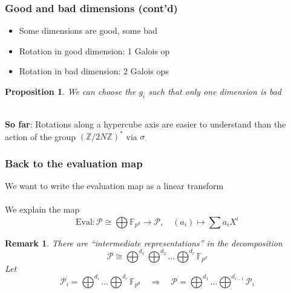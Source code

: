 \documentclass{beamer}
\newcommand{\Z}{\mathbb{Z}}
\newcommand{\F}{\mathbb{F}}
\newtheorem{remark}{Remark}
\newtheorem{prop}{Proposition}
\begin{document}
\begin{frame}
    \frametitle{Good and bad dimensions (cont'd)}

    \begin{itemize}
        \item Some dimensions are good, some bad
        \item Rotation in good dimension: 1 Galois op
        \item Rotation in bad dimension: 2 Galois ops
    \end{itemize}
    \begin{prop}
        We can choose the $g_i$ such that only one dimension is bad
    \end{prop}
    ~\\
    \textbf{So far}: Rotations along a hypercube axis are easier to understand than the action of the group $(\Z/2N\Z)^*$ via $\sigma_{\cdot}$
\end{frame}

\begin{frame}
    \frametitle{Back to the evaluation map}

    We want to write the evaluation map as a linear transform
    \\~\\
    We explain the map
    \begin{equation*}
        \mathrm{Eval}: \mathcal{P} \cong \bigoplus \F_{p^d} \to \mathcal{P}, \quad (a_i) \mapsto \sum a_i X^i
    \end{equation*}
    \begin{remark}
        There are ``intermediate representations'' in the decomposition
        \begin{equation*}
            \mathcal{P} \cong \bigoplus^{d_1} \bigoplus^{d_2} ... \bigoplus^{d_r} \F_{p^d}
        \end{equation*}
        Let
        \begin{equation*}
            \mathcal{P}_i = \bigoplus^{d_i} ... \bigoplus^{d_r} \F_{p^d} \quad \Rightarrow \quad \mathcal{P} = \bigoplus^{d_1} ... \bigoplus^{d_{i - 1}} \mathcal{P}_i
        \end{equation*}
    \end{remark} 
\end{frame}
\end{document}
